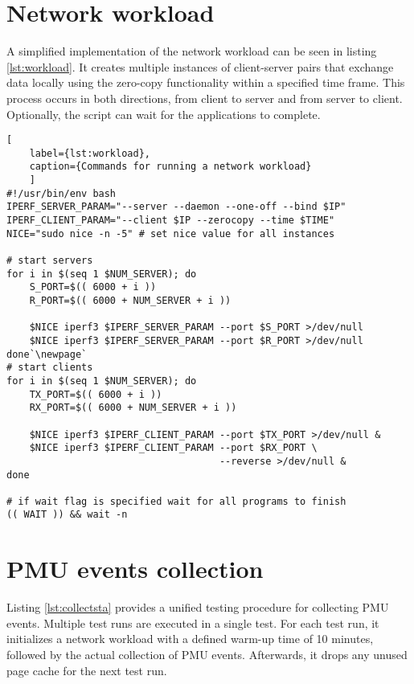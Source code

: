\vspace{-\baselineskip}
\section{Network workload}\label{appendix:workload}

A simplified implementation of the network workload can be seen in listing \ref{lst:workload}. It creates multiple instances of client-server pairs that exchange data locally using the zero-copy functionality within a specified time frame. This process occurs in both directions, from client to server and from server to client. Optionally, the script can wait for the applications to complete.

\vspace{.5\baselineskip}
\enlargethispage{2\baselineskip}
\begin{lstlisting}[
    label={lst:workload},
    caption={Commands for running a network workload}
    ]
#!/usr/bin/env bash
IPERF_SERVER_PARAM="--server --daemon --one-off --bind $IP"
IPERF_CLIENT_PARAM="--client $IP --zerocopy --time $TIME"
NICE="sudo nice -n -5" # set nice value for all instances

# start servers
for i in $(seq 1 $NUM_SERVER); do
    S_PORT=$(( 6000 + i ))
    R_PORT=$(( 6000 + NUM_SERVER + i ))

	$NICE iperf3 $IPERF_SERVER_PARAM --port $S_PORT >/dev/null
	$NICE iperf3 $IPERF_SERVER_PARAM --port $R_PORT >/dev/null
done`\newpage`
# start clients
for i in $(seq 1 $NUM_SERVER); do
    TX_PORT=$(( 6000 + i ))
    RX_PORT=$(( 6000 + NUM_SERVER + i ))
    
    $NICE iperf3 $IPERF_CLIENT_PARAM --port $TX_PORT >/dev/null &
    $NICE iperf3 $IPERF_CLIENT_PARAM --port $RX_PORT \
                                     --reverse >/dev/null &
done

# if wait flag is specified wait for all programs to finish
(( WAIT )) && wait -n
\end{lstlisting}

\section{PMU events collection}\label{appendix:events}

Listing \ref{lst:collectsta} provides a unified testing procedure for collecting PMU events. Multiple test runs are executed in a single test. For each test run, it initializes a network workload with a defined warm-up time of 10 minutes, followed by the actual collection of PMU events. Afterwards, it drops any unused page cache for the next test run.

